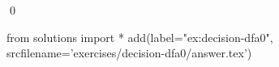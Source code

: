 
\begin{ex} 
  \label{ex:decision-dfa0}
  
  \qed
\end{ex} 
\begin{python0}
from solutions import *
add(label="ex:decision-dfa0",
    srcfilename='exercises/decision-dfa0/answer.tex') 
\end{python0}
